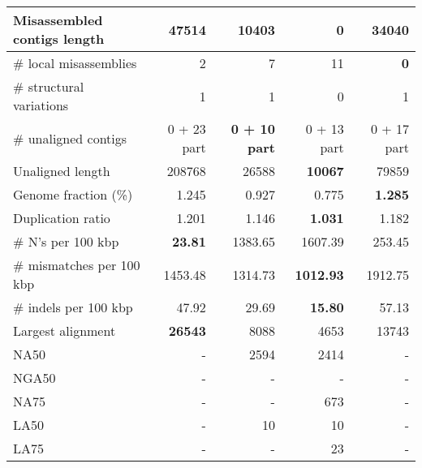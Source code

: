 \documentclass[12pt,a4paper]{article}
\begin{document}
\begin{table}[ht]
\begin{center}
\begin{tabular}{|l*{4}{|r}|}
Misassembled contigs length & 47514 & 10403 & {\bf 0} & 34040 \\ \hline
\# local misassemblies & 2 & 7 & 11 & {\bf 0} \\ \hline
\# structural variations & 1 & 1 & 0 & 1 \\ \hline
\# unaligned contigs & 0 + 23 part & {\bf 0 + 10 part} & 0 + 13 part & 0 + 17 part \\ \hline
Unaligned length & 208768 & 26588 & {\bf 10067} & 79859 \\ \hline
Genome fraction (\%) & 1.245 & 0.927 & 0.775 & {\bf 1.285} \\ \hline
Duplication ratio & 1.201 & 1.146 & {\bf 1.031} & 1.182 \\ \hline
\# N's per 100 kbp & {\bf 23.81} & 1383.65 & 1607.39 & 253.45 \\ \hline
\# mismatches per 100 kbp & 1453.48 & 1314.73 & {\bf 1012.93} & 1912.75 \\ \hline
\# indels per 100 kbp & 47.92 & 29.69 & {\bf 15.80} & 57.13 \\ \hline
Largest alignment & {\bf 26543} & 8088 & 4653 & 13743 \\ \hline
NA50 & - & 2594 & 2414 & - \\ \hline
NGA50 & - & - & - & - \\ \hline
NA75 & - & - & 673 & - \\ \hline
LA50 & - & 10 & 10 & - \\ \hline
LA75 & - & - & 23 & - \\ \hline
\end{tabular}
\end{center}
\end{table}
\end{document}

